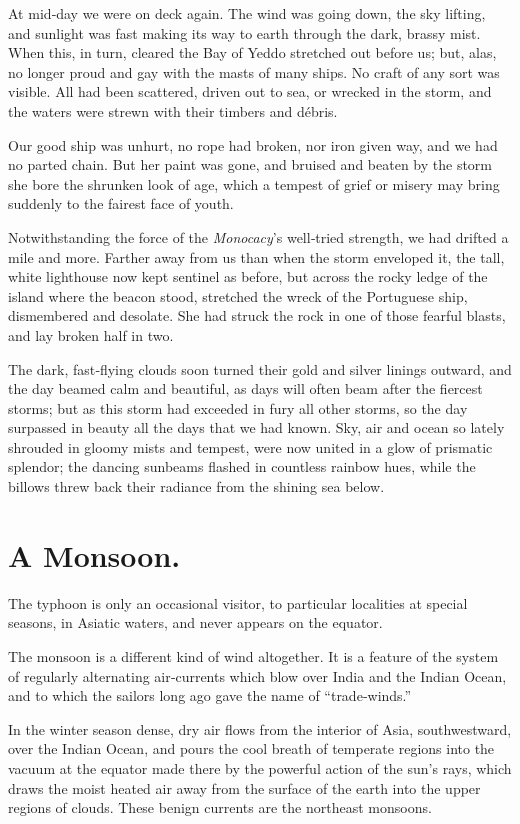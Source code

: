 \documentclass[12pt]{book}
\begin{document}
At mid‐day we were on deck again. The wind was going down, the sky lifting,
and sunlight was fast making its way to earth through the dark, brassy mist.
When this, in turn, cleared the Bay of Yeddo stretched out before us; but, alas,
no longer proud and gay with the masts of many ships. No craft of any sort was
visible. All had been scattered, driven out to sea, or wrecked in the storm, and
the waters were strewn with their timbers and débris.

Our good ship was unhurt, no rope had broken, nor iron given way, and we
had no parted chain. But her paint was gone, and bruised and beaten by the storm
she bore the shrunken look of age, which a tempest of grief or misery may bring
suddenly to the fairest face of youth.

Notwithstanding the force of the {\it Monocacy}’s well‐tried strength, we had
drifted a mile and more. Farther away from us than when the storm enveloped it,
the tall, white lighthouse now kept sentinel as before, but across the rocky ledge
of the island where the beacon stood, stretched the wreck of the Portuguese ship,
dismembered and desolate. She had struck the rock in one of those fearful blasts,
and lay broken half in two.

The dark, fast‐flying clouds soon turned their gold and silver linings outward,
and the day beamed calm and beautiful, as days will often beam after the fiercest
storms; but as this storm had exceeded in fury all other storms, so the day
surpassed in beauty all the days that we had known. Sky, air and ocean so lately
shrouded in gloomy mists and tempest, were now united in a glow of prismatic
splendor; the dancing sunbeams flashed in countless rainbow hues, while the
billows threw back their radiance from the shining sea below.

\chapter{A Monsoon.}

The typhoon is only an occasional visitor, to particular localities at special seasons,
in Asiatic waters, and never appears on the equator.

The monsoon is a different kind of wind altogether. It is a feature of the system
of regularly alternating air‐currents which blow over India and the Indian Ocean,
and to which the sailors long ago gave the name of “trade‐winds.”

In the winter season dense, dry air flows from the interior of Asia, southwestward, over the Indian Ocean, and pours the cool breath of temperate regions into
the vacuum at the equator made there by the powerful action of the sun’s rays,
which draws the moist heated air away from the surface of the earth into the
upper regions of clouds. These benign currents are the northeast monsoons.
\end{document}
